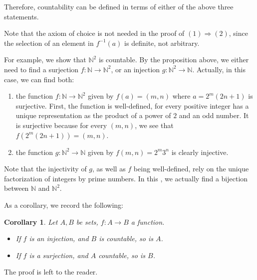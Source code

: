 \documentclass[12pt]{article}
\newtheorem{cor}{Corollary}
\begin{document}
Therefore, countability can be defined in terms of either of the above three statements.

Note that the axiom of choice is not needed in the proof of $(1)\Rightarrow (2)$, since the selection of an element in $f^{-1}(a)$ is definite, not arbitrary.

For example, we show that $\mathbb{N}^2$ is countable.  By the proposition above, we either need to find a surjection $f: \mathbb{N} \to \mathbb{N}^2$, or an injection $g: \mathbb{N}^2 \to \mathbb{N}$.  Actually, in this case, we can find both:
\begin{enumerate}
\item the function $f:\mathbb{N} \to \mathbb{N}^2$ given by $f(a)=(m,n)$ where $a=2^m(2n+1)$ is surjective.  First, the function is well-defined, for every positive integer has a unique representation as the product of a power of $2$ and an odd number.  It is surjective because for every $(m,n)$, we see that $f(2^m(2n+1))=(m,n)$.
\item the function $g:\mathbb{N}^2 \to \mathbb{N}$ given by $f(m,n)=2^m 3^n$ is clearly injective.
\end{enumerate}
Note that the injectivity of $g$, as well as $f$ being well-defined, rely on the unique factorization of integers by prime numbers.  In this , we actually find a bijection between $\mathbb{N}$ and $\mathbb{N}^2$.

As a corollary, we record the following:
\begin{cor} Let $A,B$ be sets, $f:A\to B$ a function.  
\begin{itemize}
\item If $f$ is an injection, and $B$ is countable, so is $A$.  
\item If $f$ is a surjection, and $A$ countable, so is $B$. 
\end{itemize}
\end{cor}

The proof is left to the reader.
\end{document}
